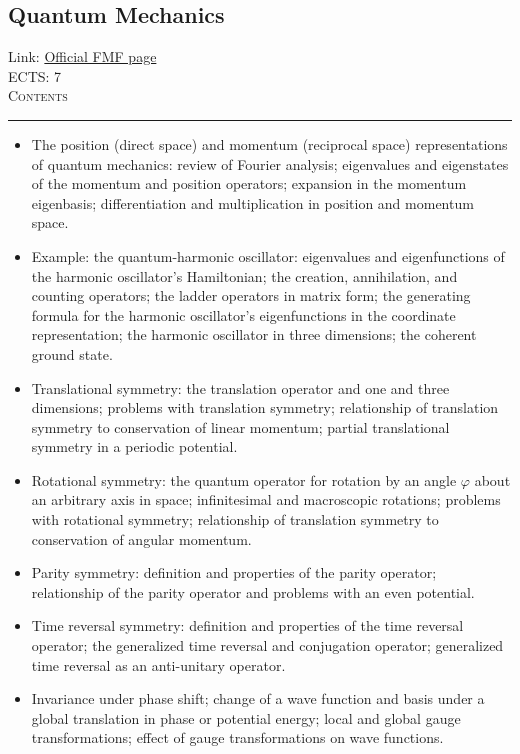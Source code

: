 \documentclass[11pt, a4paper]{article}
\newenvironment{course}[3]{
\subsection{#1}%
Link: \href{#2}{Official FMF page}\\%
ECTS: #3%
\vspace{1ex}
\\
{\large \textsc{Contents}}\\[-0.9ex]%
\rule{\textwidth}{0.5pt}
\vspace{-3ex}
}
{}
\newenvironment{chapter}[1]{
\begin{tcolorbox}[title=#1, breakable]
}
{\end{tcolorbox}}
\begin{document}
\begin{course}{Quantum Mechanics}{https://www.fmf.uni-lj.si/en/study-physics/programmes/1fiz/2020/7000777/courses/1156/}{7}
\begin{chapter}{The Dirac formalism}
\begin{itemize}
            \item The position (direct space) and momentum (reciprocal space) representations of quantum mechanics: review of Fourier analysis; eigenvalues and eigenstates of the momentum and position operators; expansion in the momentum eigenbasis; differentiation and multiplication in position and momentum space.

            \item Example: the quantum-harmonic oscillator: eigenvalues and eigenfunctions of the harmonic oscillator's Hamiltonian; the creation, annihilation, and counting operators; the ladder operators in matrix form; the generating formula for the harmonic oscillator's eigenfunctions in the coordinate representation; the harmonic oscillator in three dimensions; the coherent ground state.

        \end{itemize}
    \end{chapter}

    \begin{chapter}{Symmetries}
        
        \begin{itemize}
        
            \item Translational symmetry: the translation operator and one and three dimensions; problems with translation symmetry; relationship of translation symmetry to conservation of linear momentum; partial translational symmetry in a periodic potential.

            \item Rotational symmetry: the quantum operator for rotation by an angle $ \varphi $ about an arbitrary axis in space; infinitesimal and macroscopic rotations; problems with rotational symmetry; relationship of translation symmetry to conservation of angular momentum.

            \item Parity symmetry: definition and properties of the parity operator; relationship of the parity operator and problems with an even potential.

            \item Time reversal symmetry: definition and properties of the time reversal operator; the generalized time reversal and conjugation operator; generalized time reversal as an anti-unitary operator.

            \item Invariance under phase shift; change of a wave function and basis under a global translation in phase or potential energy; local and global gauge transformations; effect of gauge transformations on wave functions.
        

\end{itemize}
\end{chapter}
\end{course}
\end{document}
